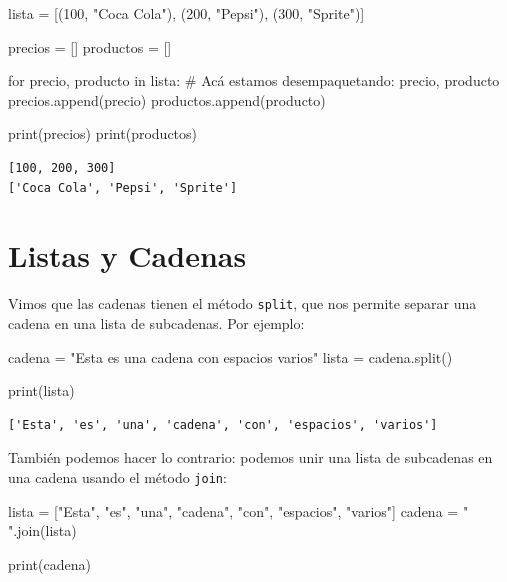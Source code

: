 \documentclass[
  letterpaper,
  DIV=11,
  numbers=noendperiod]{scrreprt}
\newenvironment{Shaded}{\begin{snugshade}}{\end{snugshade}}
\newcommand{\BuiltInTok}[1]{\textcolor[rgb]{0.00,0.23,0.31}{#1}}
\newcommand{\CommentTok}[1]{\textcolor[rgb]{0.37,0.37,0.37}{#1}}
\newcommand{\ControlFlowTok}[1]{\textcolor[rgb]{0.00,0.23,0.31}{#1}}
\newcommand{\DecValTok}[1]{\textcolor[rgb]{0.68,0.00,0.00}{#1}}
\newcommand{\KeywordTok}[1]{\textcolor[rgb]{0.00,0.23,0.31}{#1}}
\newcommand{\NormalTok}[1]{\textcolor[rgb]{0.00,0.23,0.31}{#1}}
\newcommand{\OperatorTok}[1]{\textcolor[rgb]{0.37,0.37,0.37}{#1}}
\newcommand{\StringTok}[1]{\textcolor[rgb]{0.13,0.47,0.30}{#1}}
\begin{document}
\begin{Shaded}
\begin{Highlighting}[]
\NormalTok{lista }\OperatorTok{=}\NormalTok{ [(}\DecValTok{100}\NormalTok{, }\StringTok{"Coca Cola"}\NormalTok{), (}\DecValTok{200}\NormalTok{, }\StringTok{"Pepsi"}\NormalTok{), (}\DecValTok{300}\NormalTok{, }\StringTok{"Sprite"}\NormalTok{)]}

\NormalTok{precios }\OperatorTok{=}\NormalTok{ []}
\NormalTok{productos }\OperatorTok{=}\NormalTok{ []}

\ControlFlowTok{for}\NormalTok{ precio, producto }\KeywordTok{in}\NormalTok{ lista: }\CommentTok{\# Acá estamos desempaquetando: precio, producto}
\NormalTok{    precios.append(precio)}
\NormalTok{    productos.append(producto)}

\BuiltInTok{print}\NormalTok{(precios)}
\BuiltInTok{print}\NormalTok{(productos)}
\end{Highlighting}
\end{Shaded}

\begin{verbatim}
[100, 200, 300]
['Coca Cola', 'Pepsi', 'Sprite']
\end{verbatim}

\section{Listas y Cadenas}\label{listas-y-cadenas}

Vimos que las cadenas tienen el método \texttt{split}, que nos permite
separar una cadena en una lista de subcadenas. Por ejemplo:

\begin{Shaded}
\begin{Highlighting}[]
\NormalTok{cadena }\OperatorTok{=} \StringTok{"Esta es una      cadena con    espacios   varios"}
\NormalTok{lista }\OperatorTok{=}\NormalTok{ cadena.split()}

\BuiltInTok{print}\NormalTok{(lista)}
\end{Highlighting}
\end{Shaded}

\begin{verbatim}
['Esta', 'es', 'una', 'cadena', 'con', 'espacios', 'varios']
\end{verbatim}

También podemos hacer lo contrario: podemos unir una lista de subcadenas
en una cadena usando el método \texttt{join}:

\begin{Shaded}
\begin{Highlighting}[]
\NormalTok{lista }\OperatorTok{=}\NormalTok{ [}\StringTok{"Esta"}\NormalTok{, }\StringTok{"es"}\NormalTok{, }\StringTok{"una"}\NormalTok{, }\StringTok{"cadena"}\NormalTok{, }\StringTok{"con"}\NormalTok{, }\StringTok{"espacios"}\NormalTok{, }\StringTok{"varios"}\NormalTok{]}
\NormalTok{cadena }\OperatorTok{=} \StringTok{" "}\NormalTok{.join(lista)}

\BuiltInTok{print}\NormalTok{(cadena)}
\end{Highlighting}
\end{Shaded}
\end{document}
